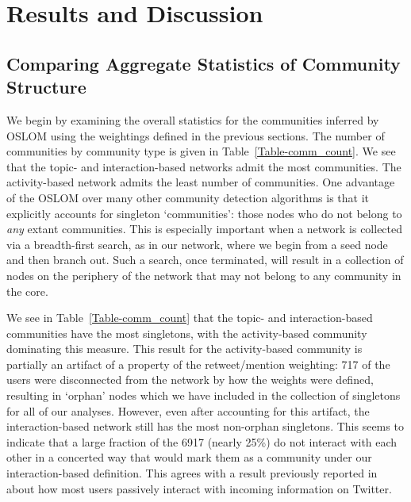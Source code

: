 \section{Results and Discussion}

\subsection{Comparing Aggregate Statistics of Community Structure}

We begin by examining the overall statistics for the communities inferred by OSLOM using the weightings defined in the previous sections. The number of communities by community type is given in Table~\ref{Table-comm_count}. We see that the topic- and interaction-based networks admit the most communities. The activity-based network admits the least number of communities.  One advantage of the OSLOM over many other community detection algorithms is that it explicitly accounts for singleton `communities': those nodes who do not belong to \emph{any} extant communities. This is especially important when a network is collected via a breadth-first search, as in our network, where we begin from a seed node and then branch out. Such a search, once terminated, will result in a collection of nodes on the periphery of the network that may not belong to any community in the core.


We see in Table~\ref{Table-comm_count} that the topic- and interaction-based communities have the most singletons, with the activity-based community dominating this measure. This result for the activity-based community is partially an artifact of a property of the retweet/mention weighting: 717 of the users were disconnected from the network by how the weights were defined, resulting in `orphan' nodes which we have included in the collection of singletons for all of our analyses. However, even after accounting for this artifact, the interaction-based network still has the most non-orphan singletons. This seems to indicate that a large fraction of the 6917 (nearly 25\%) do not interact with each other in a concerted way that would mark them as a community under our interaction-based definition. This agrees with a result previously reported in~\cite{romero2011influence} about how most users passively interact with incoming information on Twitter.

